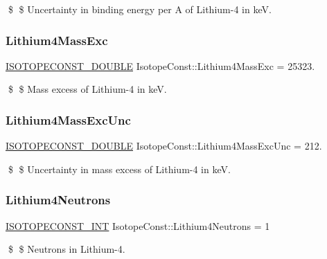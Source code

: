 \$ \$ Uncertainty in binding energy per A of Lithium-\/4 in keV. \mbox{\label{group___isotope_const-_lithium-_li4_ga63c26f05e41a10df846307abb4701716}} 
\subsubsection{\texorpdfstring{Lithium4\+Mass\+Exc}{Lithium4MassExc}}
{\footnotesize\ttfamily \mbox{\hyperlink{group___isotope_const-_macros_ga8f45a7272ce02c0b4c65c44636ed719a}{I\+S\+O\+T\+O\+P\+E\+C\+O\+N\+S\+T\+\_\+\+D\+O\+U\+B\+LE}} Isotope\+Const\+::\+Lithium4\+Mass\+Exc = 25323.}

\$ \$ Mass excess of Lithium-\/4 in keV. \mbox{\label{group___isotope_const-_lithium-_li4_ga5df3d55282de04c017840d20cedf0991}} 
\subsubsection{\texorpdfstring{Lithium4\+Mass\+Exc\+Unc}{Lithium4MassExcUnc}}
{\footnotesize\ttfamily \mbox{\hyperlink{group___isotope_const-_macros_ga8f45a7272ce02c0b4c65c44636ed719a}{I\+S\+O\+T\+O\+P\+E\+C\+O\+N\+S\+T\+\_\+\+D\+O\+U\+B\+LE}} Isotope\+Const\+::\+Lithium4\+Mass\+Exc\+Unc = 212.}

\$ \$ Uncertainty in mass excess of Lithium-\/4 in keV. \mbox{\label{group___isotope_const-_lithium-_li4_gad07d5ff90219376b8d8d862a18920c2b}} 
\subsubsection{\texorpdfstring{Lithium4\+Neutrons}{Lithium4Neutrons}}
{\footnotesize\ttfamily \mbox{\hyperlink{group___isotope_const-_macros_ga5f18360b3e99483a35c32d789e62621c}{I\+S\+O\+T\+O\+P\+E\+C\+O\+N\+S\+T\+\_\+\+I\+NT}} Isotope\+Const\+::\+Lithium4\+Neutrons = 1}

\$ \$ Neutrons in Lithium-\/4. \mbox{\label{group___isotope_const-_lithium-_li4_ga96019360db51d3f7c91c04265102c0b7}} 
